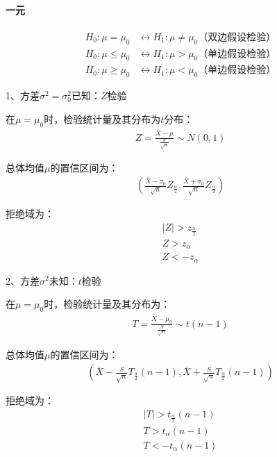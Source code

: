 \documentclass[12pt]{book}
\begin{document}
\paragraph{一元}

\begin{align*}
    H_0: \mu = \mu_0    & \leftrightarrow  	H_1: \mu \neq  \mu_0 \text{（双边假设检验）} \\
    H_0: \mu \leq \mu_0 & \leftrightarrow  	H_1: \mu > \mu_0 \text{（单边假设检验）}     \\
    H_0: \mu \geq \mu_0 & \leftrightarrow  	H_1: \mu < \mu_0 \text{（单边假设检验）}
\end{align*}


1、方差$\sigma^2 = \sigma^2_0$已知：$Z$检验

在$\mu = \mu_0$时，检验统计量及其分布为$t$分布：
\begin{gather*}
    Z=\frac{\overline{X}-\mu}{\frac{\sigma}{\sqrt{n}}}\sim N(0,1)
\end{gather*}


总体均值$\mu$的置信区间为：
\begin{gather*}
    \left(\frac{\overline{X}-\sigma_0}{\sqrt{n}}Z_{\frac{\alpha}{2}}, \frac{\overline{X}+\sigma_0}{\sqrt{n}}Z_{\frac{\alpha}{2}} \right)
\end{gather*}


拒绝域为：
\begin{gather*}
    \left|Z\right|>z_{\frac{\alpha}{2}} \\
    Z >  z_\alpha\\
    Z < -z_\alpha
\end{gather*}


2、方差$\sigma^2$未知：$t$检验

在$\mu = \mu_0$时，检验统计量及其分布为：
\begin{gather*}
    T=\frac{\overline{X}-\mu_0}{\frac{S}{\sqrt{n}}}\sim t(n-1)
\end{gather*}


总体均值$\mu$的置信区间为：
\begin{gather*}
    \left( \overline{X}-\frac{S}{\sqrt{n}}T_{\frac{\alpha}{2}}(n-1), \overline{X}+\frac{S}{\sqrt{n}}T_{\frac{\alpha}{2}}(n-1) \right)
\end{gather*}


拒绝域为：
\begin{gather*}
    \left|T\right|>t_{\frac{\alpha}{2}}\left(n-1\right) \\
    T>t_\alpha\left(n-1\right) \\
    T<-t_\alpha\left(n-1\right)
\end{gather*}
\end{document}
